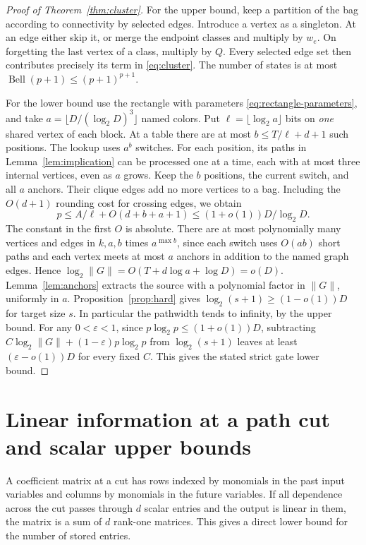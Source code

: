 \documentclass[11pt]{article}
\theoremstyle{definition}
\begin{document}
\begin{proof}[Proof of Theorem~\ref{thm:cluster}]
For the upper bound, keep a partition of the bag according to connectivity by selected edges. Introduce a vertex as a singleton. At an edge either skip it, or merge the endpoint classes and multiply by \(w_e\). On forgetting the last vertex of a class, multiply by \(Q\). Every selected edge set then contributes precisely its term in \eqref{eq:cluster}. The number of states is at most \(\operatorname{Bell}(p+1)\le(p+1)^{p+1}\).

For the lower bound use the rectangle with parameters \eqref{eq:rectangle-parameters}, and take \(a=\lfloor D/(\log_2 D)^3\rfloor\) named colors. Put \(\ell=\lfloor\log_2 a\rfloor\) bits on \emph{one} shared vertex of each block. At a table there are at most \(b\le T/\ell+d+1\) such positions. The lookup uses \(a^b\) switches. For each position, its paths in Lemma~\ref{lem:implication} can be processed one at a time, each with at most three internal vertices, even as \(a\) grows. Keep the \(b\) positions, the current switch, and all \(a\) anchors. Their clique edges add no more vertices to a bag. Including the \(O(d+1)\) rounding cost for crossing edges, we obtain
\[
 p\le A/\ell+O(d+b+a+1)\le (1+o(1))D/\log_2 D .
\]
The constant in the first \(O\) is absolute. There are at most polynomially many vertices and edges in \(k,a,b\) times \(a^{\max b}\), since each switch uses \(O(ab)\) short paths and each vertex meets at most \(a\) anchors in addition to the named graph edges. Hence \(\log_2 \|G\|=O(T+d\log a+\log D)=o(D)\). Lemma~\ref{lem:anchors} extracts the source with a polynomial factor in \(\|G\|\), uniformly in \(a\). Proposition~\ref{prop:hard} gives \(\log_2(s+1)\ge(1-o(1))D\) for target size \(s\). In particular the pathwidth tends to infinity, by the upper bound. For any \(0<\varepsilon<1\), since \(p\log_2 p\le(1+o(1))D\), subtracting \(C\log_2 \|G\|+(1-\varepsilon)p\log_2 p\) from \(\log_2(s+1)\) leaves at least \((\varepsilon-o(1))D\) for every fixed \(C\). This gives the stated strict gate lower bound.
\end{proof}

\section{Linear information at a path cut and scalar upper bounds}\label{sec:frontiers}

A coefficient matrix at a cut has rows indexed by monomials in the past input variables and columns by monomials in the future variables. If all dependence across the cut passes through \(d\) scalar entries and the output is linear in them, the matrix is a sum of \(d\) rank-one matrices. This gives a direct lower bound for the number of stored entries.
\end{document}
